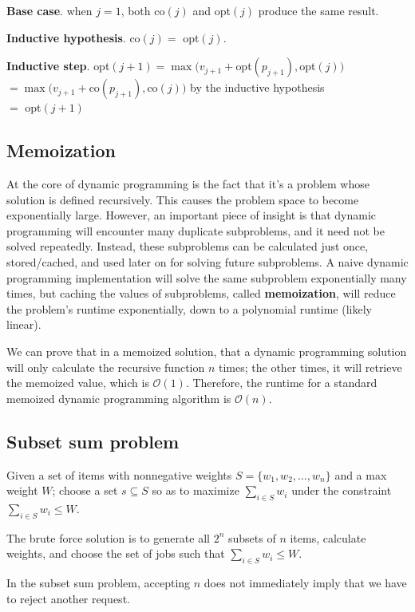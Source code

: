 \documentclass{article}
\newcommand{\Oh}{\mathcal{O}}
\begin{document}
\textbf{Base case}. when $j = 1$, both {\sc co}$(j)$ and {\sc opt}$(j)$ produce the same result.

\textbf{Inductive hypothesis}. {\sc co}$(j) =$ {\sc opt}$(j)$.

\textbf{Inductive step}. {\sc opt}$(j + 1) = \max(v_{j + 1} + ${\sc opt}$(p_{j + 1}), ${\sc opt}$(j))$\\
$= \max(v_{j + 1} + ${\sc co}$(p_{j + 1}), ${\sc co}$(j))$ by the inductive hypothesis\\
$=$ {\sc opt}$(j + 1)$


\subsection{Memoization}
At the core of dynamic programming is the fact that it's a problem whose solution is defined recursively. This causes the problem space to become exponentially large. However, an important piece of insight is that dynamic programming will encounter many duplicate subproblems, and it need not be solved repeatedly. Instead, these subproblems can be calculated just once, stored/cached, and used later on for solving future subproblems. A naive dynamic programming implementation will solve the same subproblem exponentially many times, but caching the values of subproblems, called \textbf{memoization}, will reduce the problem's runtime exponentially, down to a polynomial runtime (likely linear).

We can prove that in a memoized solution, that a dynamic programming solution will only calculate the recursive function $n$ times; the other times, it will retrieve the memoized value, which is $\Oh(1)$. Therefore, the runtime for a standard memoized dynamic programming algorithm is $\Oh(n)$.

\subsection{Subset sum problem}
Given a set of items with nonnegative weights $S = \{w_1, w_2, \dots, w_n\}$ and a max weight $W$; choose a set $s \subseteq S$ so as to maximize $\sum_{i \in S} w_i$ under the constraint $\sum_{i \in S} w_i \leq W$.

The brute force solution is to generate all $2^n$ subsets of $n$ items, calculate weights, and choose the set of jobs such that $\sum_{i \in S} w_i \leq W$.

In the subset sum problem, accepting $n$ does not immediately imply that we have to reject another request.
\end{document}
